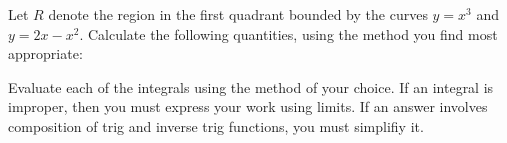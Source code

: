 \documentclass[12pt, addpoints]{exam/exam}
\newcommand{\1}{^{-1}}
\theoremstyle{plain}
\begin{document}
\begin{questions}

\newpage
\question%
Let $R$ denote the region in the first quadrant bounded by the curves $y=x^3$ and $y=2x-x^2$.  Calculate the following quantities, using the method you find most appropriate:

\newpage
\question Evaluate each of the integrals using the method of your choice.  If an integral is improper, then you must express your work using limits.  If an answer involves composition of trig and inverse trig functions, you must simplifiy it.
\end{questions}
\end{document}
